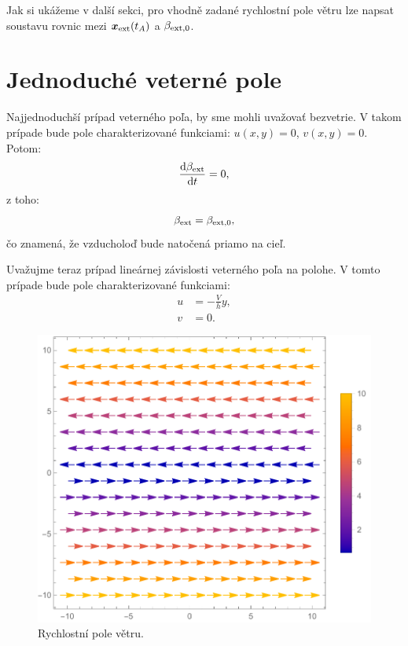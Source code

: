 \documentclass[reqno, a4paper]{amsart}
\numberwithin{equation}{section}
\begin{document}
Jak si ukážeme v další sekci, pro vhodně zadané rychlostní pole větru lze napsat soustavu rovnic mezi $\bm{x}_{\mathrm{ext}}(t_{A})$ a $ \beta_{\mathrm{ext}, 0}$.

\section{Jednoduché veterné pole}
\label{sec:JVP}
Najjednoduchší prípad veterného poľa, by sme mohli uvažovať bezvetrie. V takom prípade bude pole charakterizované funkciami: $u(x,y)=0$, $v(x,y)=0$. Potom:
\begin{align}
\frac{\mathrm{d} {\beta_{\mathrm{ext}}}}{\mathrm{d} {t}} = 0,
\end{align}
z toho:
\begin{align}
\beta_{\mathrm{ext}} =\beta_{\mathrm{ext},0},
\end{align}
čo znamená, že vzducholoď bude natočená priamo na cieľ.

Uvažujme teraz prípad lineárnej závislosti veterného poľa na polohe. V tomto prípade bude pole charakterizované funkciami:
\begin{align}
u &= -\frac{V}{h}y ,\\
v &= 0.
\end{align}

\begin{figure}
\includegraphics[scale=0.7]{figures/Vekt.pole.pdf}
\caption{Rychlostní pole větru.}
\label{pole}
\end{figure}
\end{document}

